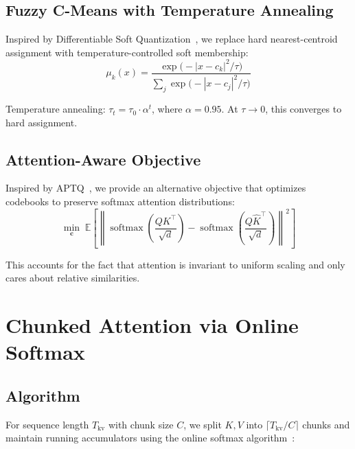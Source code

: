 \documentclass[11pt,a4paper]{article}
\begin{document}
\subsection{Fuzzy C-Means with Temperature Annealing}

Inspired by Differentiable Soft Quantization~\cite{gong2019dsq}, we replace hard nearest-centroid assignment with temperature-controlled soft membership:
\begin{equation}\label{eq:fuzzy-membership}
  \mu_k(x) = \frac{\exp\!\bigl(-|x - c_k|^2 / \tau\bigr)}{\displaystyle\sum_{j} \exp\!\bigl(-|x - c_j|^2 / \tau\bigr)}
\end{equation}

Temperature annealing: $\tau_t = \tau_0 \cdot \alpha^t$, where $\alpha = 0.95$. At $\tau \to 0$, this converges to hard assignment.

\subsection{Attention-Aware Objective}

Inspired by APTQ~\cite{li2024aptq}, we provide an alternative objective that optimizes codebooks to preserve softmax attention distributions:
\begin{equation}\label{eq:attn-objective}
  \min_{\mathbf{c}} \; \mathbb{E}\!\left[\left\|\operatorname{softmax}\!\left(\frac{QK^\top}{\sqrt{d}}\right) - \operatorname{softmax}\!\left(\frac{Q\hat{K}^\top}{\sqrt{d}}\right)\right\|^2\right]
\end{equation}

This accounts for the fact that attention is invariant to uniform scaling and only cares about relative similarities.

\section{Chunked Attention via Online Softmax}

\subsection{Algorithm}

For sequence length $T_\text{kv}$ with chunk size $C$, we split $K, V$ into $\lceil T_\text{kv}/C \rceil$ chunks and maintain running accumulators using the online softmax algorithm~\cite{milakov2018online,dao2022flashattention}:
\end{document}
